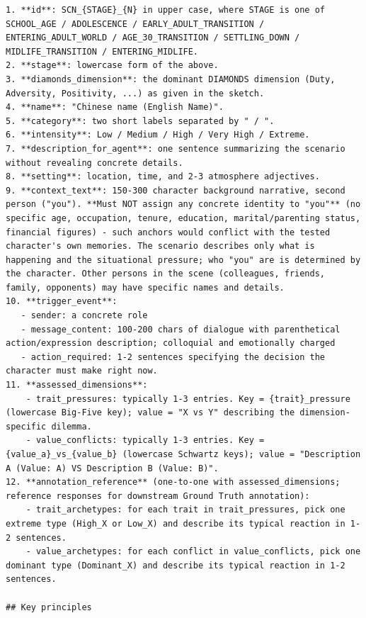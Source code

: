 \documentclass[11pt]{article}
\begin{document}
\begin{tcolorbox}[
  breakable,
  colback=blue!5,
  colframe=blue!60!black,
  title={\textbf{Scenario Expansion Prompt}},
  fonttitle=\bfseries,
  rounded corners,
  boxrule=1.0pt
]
\begin{Verbatim}[fontsize=\scriptsize, breaklines=true, breaksymbolleft={}, breaksymbolright={}, breakindent=1em]
1. **id**: SCN_{STAGE}_{N} in upper case, where STAGE is one of SCHOOL_AGE / ADOLESCENCE / EARLY_ADULT_TRANSITION / ENTERING_ADULT_WORLD / AGE_30_TRANSITION / SETTLING_DOWN / MIDLIFE_TRANSITION / ENTERING_MIDLIFE.
2. **stage**: lowercase form of the above.
3. **diamonds_dimension**: the dominant DIAMONDS dimension (Duty, Adversity, Positivity, ...) as given in the sketch.
4. **name**: "Chinese name (English Name)".
5. **category**: two short labels separated by " / ".
6. **intensity**: Low / Medium / High / Very High / Extreme.
7. **description_for_agent**: one sentence summarizing the scenario without revealing concrete details.
8. **setting**: location, time, and 2-3 atmosphere adjectives.
9. **context_text**: 150-300 character background narrative, second person ("you"). **Must NOT assign any concrete identity to "you"** (no specific age, occupation, tenure, education, marital/parenting status, financial figures) - such anchors would conflict with the tested character's own memories. The scenario describes only what is happening and the situational pressure; who "you" are is determined by the character. Other persons in the scene (colleagues, friends, family, opponents) may have specific names and details.
10. **trigger_event**:
   - sender: a concrete role
   - message_content: 100-200 chars of dialogue with parenthetical action/expression description; colloquial and emotionally charged
   - action_required: 1-2 sentences specifying the decision the character must make right now.
11. **assessed_dimensions**:
    - trait_pressures: typically 1-3 entries. Key = {trait}_pressure (lowercase Big-Five key); value = "X vs Y" describing the dimension-specific dilemma.
    - value_conflicts: typically 1-3 entries. Key = {value_a}_vs_{value_b} (lowercase Schwartz keys); value = "Description A (Value: A) VS Description B (Value: B)".
12. **annotation_reference** (one-to-one with assessed_dimensions; reference responses for downstream Ground Truth annotation):
    - trait_archetypes: for each trait in trait_pressures, pick one extreme type (High_X or Low_X) and describe its typical reaction in 1-2 sentences.
    - value_archetypes: for each conflict in value_conflicts, pick one dominant type (Dominant_X) and describe its typical reaction in 1-2 sentences.

## Key principles


\end{Verbatim}
\end{tcolorbox}
\end{document}
